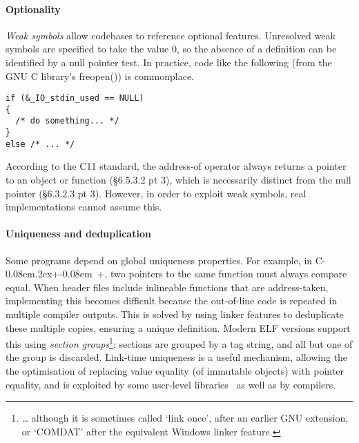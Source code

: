 \documentclass[preprint,10pt]{sigplanconf-pldi16}
\def\Cplusplus{C\kern-0.08em\raise.2ex\hbox{\footnotesize +\kern-0.08em +}}
\begin{document}
\paragraph{Optionality}

\emph{Weak symbols} allow codebases to reference optional features. 
Unresolved weak symbols are specified to take the value 0, so 
the absence of a definition can be identified by a null pointer test.
In practice, code like the following (from the GNU C library's 
\textsf{freopen()}) is commonplace.

{\scriptsize\begin{lstlisting}
if (&_IO_stdin_used == NULL)
{
  /* do something... */
}
else /* ... */
\end{lstlisting}}

According to the C11 standard, the address-of operator 
always returns a pointer to an object or function
(\S 6.5.3.2 pt 3), which is necessarily distinct from the null pointer
(\S6.3.2.3 pt 3).
However, in order to exploit weak symbols, real implementations
cannot assume this.

\paragraph{Uniqueness and deduplication}\label{sec:section-groups}\label{sec:section-group}
Some programs depend on global uniqueness properties. 
For example, in \Cplusplus{}, two pointers to the same function
must always compare equal.
When header files include inlineable functions that are address-taken, 
implementing this becomes difficult because the
out-of-line code is repeated in multiple compiler outputs.
This is solved by using linker features 
to deduplicate these multiple copies, ensuring a unique definition.
Modern ELF versions support this using \emph{section groups}\footnote{\ldots{} although it is sometimes called `link once', after an earlier GNU extension, or
`COMDAT' after the equivalent Windows linker feature.}; 
sections are grouped by a tag string, and all but one of the group is discarded.
Link-time uniqueness is a useful mechanism, allowing the 
the optimisation of replacing value equality (of immutable objects) with pointer equality,
and is exploited by some user-level libraries~\citep{kell_towards_2015} as well as by compilers.
\end{document}
